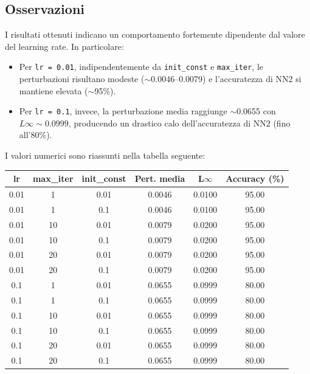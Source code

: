         \subsection{Osservazioni}
            I risultati ottenuti indicano un comportamento fortemente dipendente dal valore del learning rate.
            In particolare:
                \begin{itemize}
                  \item Per \texttt{lr = 0.01}, indipendentemente da \texttt{init\_const} e \texttt{max\_iter}, le perturbazioni risultano modeste ($\sim$0.0046--0.0079) e l’accuratezza di NN2 si mantiene elevata ($\sim$95\%).
                  
                  \item Per \texttt{lr = 0.1}, invece, la perturbazione media raggiunge $\sim$0.0655 con $L\infty \sim 0.0999$, producendo un drastico calo dell’accuratezza di NN2 (fino all’80\%).
                \end{itemize}
            
            \noindent I valori numerici sono riassunti nella tabella seguente:
                \begin{center}
                    \begin{tabular}{cccccc}
                        \toprule
                        \textbf{lr} & \textbf{max\_iter} & \textbf{init\_const} & \textbf{Pert. media} & \textbf{L$\infty$} & \textbf{Accuracy (\%)} \\
                        \midrule
                        0.01 & 1  & 0.01 & 0.0046 & 0.0100 & 95.00 \\
                        0.01 & 1  & 0.1  & 0.0046 & 0.0100 & 95.00 \\
                        0.01 & 10 & 0.01 & 0.0079 & 0.0200 & 95.00 \\
                        0.01 & 10 & 0.1  & 0.0079 & 0.0200 & 95.00 \\
                        0.01 & 20 & 0.01 & 0.0079 & 0.0200 & 95.00 \\
                        0.01 & 20 & 0.1  & 0.0079 & 0.0200 & 95.00 \\
                        0.1  & 1  & 0.01 & 0.0655 & 0.0999 & 80.00 \\
                        0.1  & 1  & 0.1  & 0.0655 & 0.0999 & 80.00 \\
                        0.1  & 10 & 0.01 & 0.0655 & 0.0999 & 80.00 \\
                        0.1  & 10 & 0.1  & 0.0655 & 0.0999 & 80.00 \\
                        0.1  & 20 & 0.01 & 0.0655 & 0.0999 & 80.00 \\
                        0.1  & 20 & 0.1  & 0.0655 & 0.0999 & 80.00 \\
                        \bottomrule
                    \end{tabular}
                \end{center}

